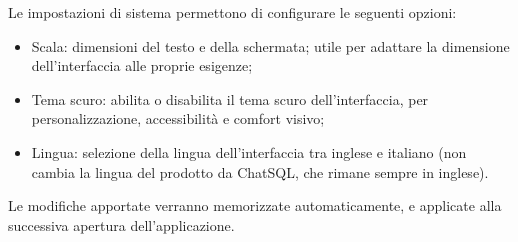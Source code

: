 \par Le impostazioni di sistema permettono di configurare le seguenti opzioni:
\begin{itemize}
  \item Scala: dimensioni del testo e della schermata; utile per adattare la dimensione dell'interfaccia alle proprie esigenze;
  \item Tema scuro: abilita o disabilita il tema scuro dell'interfaccia, per personalizzazione, accessibilità e comfort visivo;
  \item Lingua: selezione della lingua dell'interfaccia tra inglese e italiano (non cambia la lingua del  prodotto da ChatSQL, che rimane sempre in inglese).
\end{itemize}
\par Le modifiche apportate verranno memorizzate automaticamente, e applicate alla successiva apertura dell'applicazione.
